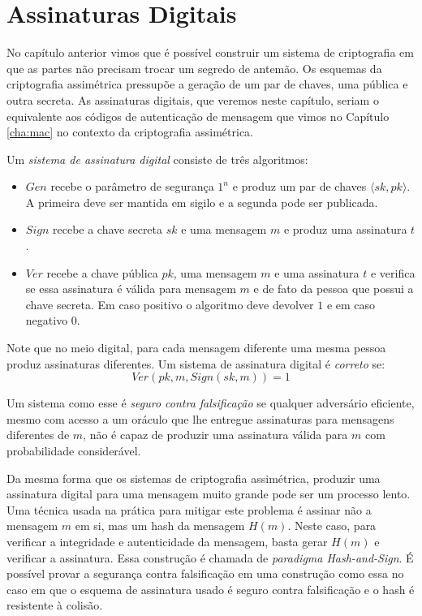 \chapter{Assinaturas Digitais}
\label{cha:assinaturas-digitais}

No capítulo anterior vimos que é possível construir um sistema de criptografia em que as partes não precisam trocar um segredo de antemão.
Os esquemas da criptografia assimétrica pressupõe a geração de um par de chaves, uma pública e outra secreta.
As assinaturas digitais, que veremos neste capítulo, seriam o equivalente aos códigos de autenticação de mensagem que vimos no Capítulo \ref{cha:mac} no contexto da criptografia assimétrica.

Um {\em sistema de assinatura digital} consiste de três algoritmos:
\begin{itemize}
\item $Gen$ recebe o parâmetro de segurança $1^n$ e produz um par de chaves $\langle sk, pk \rangle$. 
A primeira deve ser mantida em sigilo e a segunda pode ser publicada.
\item $Sign$ recebe a chave secreta $sk$ e uma mensagem $m$ e produz uma assinatura $t$.
\item $Ver$ recebe a chave pública $pk$, uma mensagem $m$ e uma assinatura $t$ e verifica se essa assinatura é válida para mensagem $m$ e de fato da pessoa que possui a chave secreta.
Em caso positivo o algoritmo deve devolver $1$ e em caso negativo $0$. 
\end{itemize}

Note que no meio digital, para cada mensagem diferente uma mesma pessoa produz assinaturas diferentes.
Um sistema de assinatura digital é {\em correto} se:
\begin{displaymath}
  Ver(pk, m, Sign(sk, m)) = 1
\end{displaymath}
 
Um sistema como esse é {\em seguro contra falsificação} se qualquer adversário eficiente, mesmo com acesso a um oráculo que lhe entregue assinaturas para mensagens diferentes de $m$, não é capaz de produzir uma assinatura válida para $m$ com probabilidade considerável.

Da mesma forma que os sistemas de criptografia assimétrica, produzir uma assinatura digital para uma mensagem muito grande pode ser um processo lento.
Uma técnica usada na prática para mitigar este problema é assinar não a mensagem $m$ em si, mas um hash da mensagem $H(m)$.
Neste caso, para verificar a integridade e autenticidade da mensagem, basta gerar $H(m)$ e verificar a assinatura.
Essa construção é chamada de {\em paradigma Hash-and-Sign}.
É possível provar a segurança contra falsificação em uma construção como essa no caso em que o esquema de assinatura usado é seguro contra falsificação e o hash é resistente à colisão.


